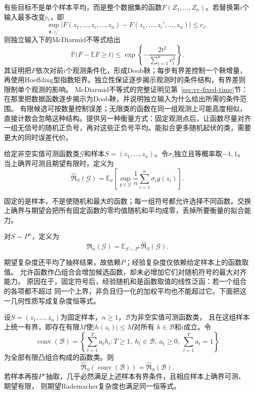 有些目标不是单个样本平均，而是整个数据集的函数\(F(Z_1,\ldots,Z_n)\)。若替换第\(i\)个输入最多改变\(c_i\)，即
\[ \sup_{\bm{z},z_i'}
  |F(z_1,\ldots,z_i,\ldots,z_n)-F(z_1,\ldots,z_i',\ldots,z_n)|\leq c_i, \]
则独立输入下的McDiarmid不等式给出
\begin{equation}
  \mathbb{P}\bigl(
    F-\mathbb{E}F\geq t
  \bigr)
  \leq
  \exp\left\{
    -\frac{2t^2}{\sum_{i=1}^{n}c_i^2}
  \right\}.
  \label{eq:probability-mcdiarmid}
\end{equation}
其证明把\(F\)依次对前\(i\)个观测条件化，形成Doob鞅；每步有界差控制一个鞅增量，再使用Hoeffding型指数矩界。独立性保证逐步揭示观测时的条件结构，有界差则限制单个观测的影响。
McDiarmid不等式的完整证明见第~\ref{sec:rv-fixed-time}节：在那里把数据函数逐步揭示为Doob鞅，并说明独立输入为什么给出所需的条件范围。
有限候选可按数量控制误差；无限类的函数在同一组观测上可能高度相似，直接计数会忽略这种结构。提供另一种衡量方式：固定观测点后，让函数尽量对齐一组无信号的随机正负号，再对这些正负号平均。能拟合更多随机起伏的类，需要更大的同时误差代价。
\begin{definition}[经验Rademacher复杂度]
  \label{def:rademacher-complexity}
  给定非空实值可测函数类\(\mathcal G\)和样本\(S=(z_1,\ldots,z_n)\)。令\(\sigma_i\)独立且等概率取\(-1,1\)。当上确界可测且期望有限时，定义为
  \begin{equation}
    \widehat{\mathfrak R}_S(\mathcal G)
    =\mathbb E_\sigma\left[\sup_{g\in\mathcal G}\frac1n\sum_{i=1}^n\sigma_i g(z_i)\right].
    \label{eq:empirical-rademacher}
  \end{equation}
\end{definition}
固定的是样本，不是使随机和最大的函数；每一组符号都允许选择不同函数。交换上确界与期望会把所有固定函数的零均值随机和平均成零，丢掉所要衡量的拟合能力。
\begin{definition}[期望Rademacher复杂度]
  \label{def:expected-rademacher-complexity}
  对\(S\sim P^n\)，定义为
  \[
    \mathfrak R_n(\mathcal G)=\mathbb E_{S\sim P^n}\widehat{\mathfrak R}_S(\mathcal G).
  \]
\end{definition}
期望复杂度还平均了抽样结果，故依赖\(P\)；经验复杂度仅依赖给定样本上的函数取值。
允许函数作凸组合会增加候选函数，却未必增加它们对随机符号的最大对齐能力。
原因在于，固定符号后，经验随机和是函数取值的线性泛函：若一个组合的各项都不超过
同一个上界，非负且归一化的加权平均也不能超过它。下面把这一几何性质写成复杂度恒等式。

\begin{theorem}[凸组合的Rademacher复杂度]
\label{thm:ensemble-convex-hull}
设$S=(z_1,\ldots,z_n)$为固定样本，$n\geq1$，$\mathcal B$为非空实值可测函数类，
且在这组样本上统一有界，即存在有限$M$使$|h(z_i)|\leq M$对所有
$h\in\mathcal B$和$i$成立。令
\[
 \operatorname{conv}(\mathcal B)
 =\left\{\sum_{t=1}^T a_t h_t:
 T\geq1,\ h_t\in\mathcal B,\ a_t\geq0,\ \sum_{t=1}^T a_t=1\right\}
\]
为全部有限凸组合构成的函数类。则
\[
 \widehat{\mathfrak R}_S(\operatorname{conv}(\mathcal B))
 =\widehat{\mathfrak R}_S(\mathcal B).
\]
若样本再按$P^n$抽取，几乎必然满足上述样本有界条件，且相应样本上确界可测、期望有限，
则期望Rademacher复杂度也满足同一恒等式。
\end{theorem}

